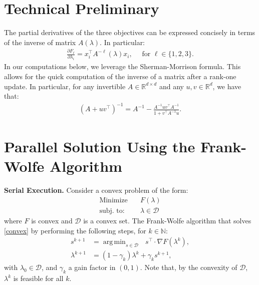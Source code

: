 \documentclass[11pt, oneside]{article}
\newcommand{\reals}{\ensuremath{\mathbb{R}}}
\newcommand{\naturals}{\ensuremath{\mathbb{N}}}
\newcommand{\argmin}{\mathop{\arg\,\min}}
\begin{document}
\section{Technical Preliminary} The partial derivatives of the three objectives can be expressed concisely in terms of the inverse of matrix $A(\lambda)$. In particular:
\begin{align}\label{gradient}
\frac{\partial F_\ell}{\partial \lambda_i} = x_i^\top A^{-\ell}(\lambda) x_i, \quad\text{ for }\ell\in \{1,2,3\}.
\end{align}
In our computations below, we leverage the Sherman-Morrison formula. This allows for the quick computation of the inverse of a matrix after a rank-one update. In particular, for any invertible $A\in \reals^{d\times d}$ and any $u,v\in\reals^d$, we have that:
\begin{align} \left(A + uv^{\top}\right)^{-1} = A^{-1} - \frac{A^{-1}uv^{\top}A^{-1}}{1+v^\top A^{-1} u}.\label{sherman-morrison}\end{align} 



\section{Parallel Solution Using the Frank-Wolfe Algorithm}

\noindent\textbf{Serial Execution.} Consider a convex problem of the form:
\begin{subequations}\label{convex}
\begin{align}
\text{Minimize} \quad & F(\lambda)\\
\text{subj.~to:} \quad & \lambda \in \mathcal{D}
\end{align}
\end{subequations}
where $F$ is convex and $\mathcal{D}$ is a convex set. The Frank-Wolfe algorithm  that solves \eqref{convex} by performing the following steps, for $k\in \naturals$:
\begin{subequations}\label{frank-wolfe-general}
\begin{align}
s^{k+1} &= \argmin_{s\in \mathcal{D}}~~~s^\top \cdot \nabla F(\lambda^k),\label{fw:s}\\
\lambda^{k+1}& = (1-\gamma_k) \lambda^k + \gamma_k s^{k+1},\label{fw:lam}
\end{align}
\end{subequations}
with $\lambda_0\in \mathcal{D}$, and $\gamma_k$ a gain factor in $(0,1)$. Note that, by the convexity of $\mathcal{D}$, $\lambda^k$ is feasible for all $k$. 
\end{document}
